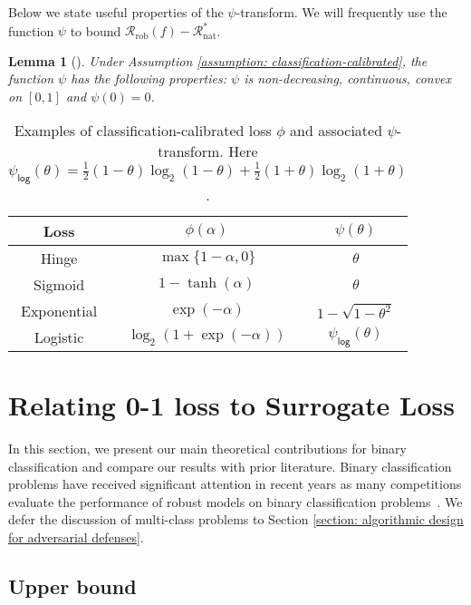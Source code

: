 \documentclass[11pt]{article}
\newcommand{\adv}{\mathrm{rob}}
\newcommand{\nat}{\mathrm{nat}}
\newtheorem{lemma}[theorem]{Lemma}
\newcommand{\0}{\mathbf{0}}
\newcommand{\1}{\mathbf{1}}
\newcommand{\cR}{\mathcal{R}}
\begin{document}
Below we state useful properties of the $\psi$-transform. We will frequently use the function $\psi$ to bound $\cR_\adv(f)-\cR_\nat^*$.

\begin{lemma}[\cite{bartlett2006convexity}]
Under Assumption \ref{assumption: classification-calibrated}, the function $\psi$ has the following properties: $\psi$ is non-decreasing, continuous, convex on $[0,1]$ and $\psi(0) = 0$. 
\end{lemma}



\begin{table}
\caption{Examples of classification-calibrated loss $\phi$ and associated $\psi$-transform. Here $\psi_{\mathsf{log}}(\theta) =  \frac{1}{2}(1-\theta) \log_2(1-\theta) + \frac{1}{2}(1+\theta)\log_2(1+\theta)$.}
\label{table: examples of classification-calibrated loss}
\centering
\begin{tabular}{c|cc}\hline
Loss & $\phi(\alpha)$ & $\psi(\theta)$
\\
\hline
Hinge & $\max\{1-\alpha,0\}$ & $\theta$\\
Sigmoid & $1-\tanh(\alpha)$ & $\theta$\\
Exponential & $\exp(-\alpha)$ & $1-\sqrt{1-\theta^2}$\\
Logistic & $\log_2(1+\exp(-\alpha))$ & $ \psi_{\mathsf{log}}(\theta)$\\
\hline
\end{tabular}
\end{table}

\section{Relating 0-1 loss to Surrogate Loss}
\vspace{-0.05cm}

In this section, we present our main theoretical
contributions for binary classification and compare our results with  prior literature. Binary classification problems have received significant attention in recent years as many competitions evaluate the performance of robust models on binary classification problems~\cite{brown2018unrestricted}. We defer the discussion of multi-class problems to Section \ref{section: algorithmic design for adversarial defenses}.

\vspace{-0.2cm}
\subsection{Upper bound}
\label{section: upper bound}
\end{document}
